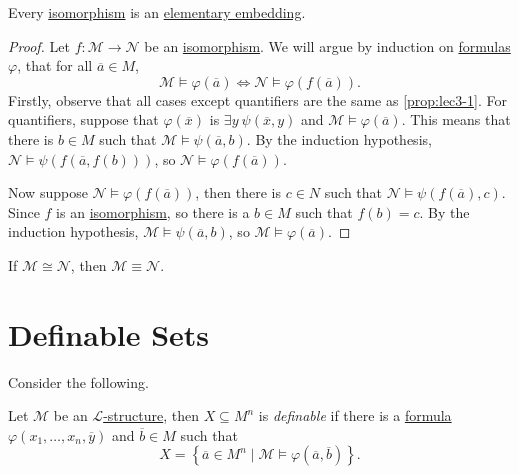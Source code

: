 \begin{proposition}\label{prop:isomorphism-is-elementary-embedding}
	Every \hyperref[def:isomorphism]{isomorphism} is an \hyperref[def:elementary-embedding]{elementary embedding}.
\end{proposition}
\begin{proof}
	Let \(f\colon \mathcal{M} \to  \mathcal{N} \) be an \hyperref[def:isomorphism]{isomorphism}. We will argue by induction on \hyperref[def:formula]{formulas} \(\varphi \), that for all \(\overline{a} \in M\),
	\[
		\mathcal{M} \models \varphi (\overline{a} ) \iff \mathcal{N} \models \varphi (f(\overline{a} )).
	\]
	Firstly, observe that all cases except quantifiers are the same as \autoref{prop:lec3-1}. For quantifiers, suppose that \(\varphi (\overline{x} )\) is \(\exists y\ \psi (\overline{x} , y)\) and \(\mathcal{M} \models \varphi (\overline{a} )\). This means that there is \(b\in M\) such that \(\mathcal{M} \models \psi (\overline{a} , b)\). By the induction hypothesis, \(\mathcal{N} \models \psi (f(\overline{a} , f(b)))\), so \(\mathcal{N} \models \varphi (f(\overline{a} ))\).

	Now suppose \(\mathcal{N} \models \varphi (f(\overline{a} ))\), then there is \(c\in N\) such that \(\mathcal{N} \models \psi (f(\overline{a} ), c)\). Since \(f\) is an \hyperref[def:isomorphism]{isomorphism}, so there is a \(b\in M\) such that \(f(b) = c\). By the induction hypothesis, \(\mathcal{M} \models \psi (\overline{a} , b)\), so \(\mathcal{M} \models \varphi (\overline{a} )\).
\end{proof}

\begin{corollary}
	If \(\mathcal{M} \cong \mathcal{N} \), then \(\mathcal{M} \equiv \mathcal{N} \).
\end{corollary}

\section{Definable Sets}
Consider the following.

\begin{definition}[Definable]\label{def:definable}
	Let \(\mathcal{M} \) be an \hyperref[def:structure]{\(\mathcal{L} \)-structure}, then \(X \subseteq M^n\) is \emph{definable} if there is a \hyperref[def:formula]{formula} \(\varphi (x_1, \ldots , x_n, \overline{y} )\) and \(\overline{b} \in M\) such that
	\[
		X = \left\{ \overline{a} \in M^n \mid \mathcal{M} \models \varphi (\overline{a} , \overline{b} ) \right\}.
	\]
\end{definition}

